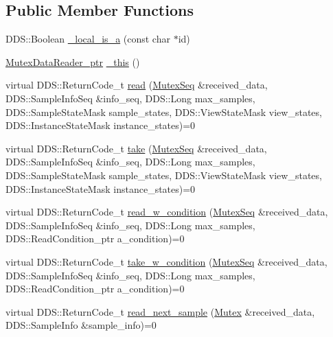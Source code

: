 \subsection*{Public Member Functions}
\begin{DoxyCompactItemize}
\item 
DDS::Boolean \hyperlink{classKnowledge_1_1MutexDataReader_aaada9486c9827e216a4c270e16dab516}{\_\-local\_\-is\_\-a} (const char $\ast$id)
\item 
\hyperlink{classKnowledge_1_1MutexDataReader}{MutexDataReader\_\-ptr} \hyperlink{classKnowledge_1_1MutexDataReader_a33f387fdc9f878e1ed448d63de1ec4c7}{\_\-this} ()
\item 
virtual DDS::ReturnCode\_\-t \hyperlink{classKnowledge_1_1MutexDataReader_af9d5bf62acb99639c541642065b8da93}{read} (\hyperlink{namespaceKnowledge_a3165529aa87299c6a92754fbd7eeeff4}{MutexSeq} \&received\_\-data, DDS::SampleInfoSeq \&info\_\-seq, DDS::Long max\_\-samples, DDS::SampleStateMask sample\_\-states, DDS::ViewStateMask view\_\-states, DDS::InstanceStateMask instance\_\-states)=0
\item 
virtual DDS::ReturnCode\_\-t \hyperlink{classKnowledge_1_1MutexDataReader_a9deff0455f4676c19067cde4b7962dd2}{take} (\hyperlink{namespaceKnowledge_a3165529aa87299c6a92754fbd7eeeff4}{MutexSeq} \&received\_\-data, DDS::SampleInfoSeq \&info\_\-seq, DDS::Long max\_\-samples, DDS::SampleStateMask sample\_\-states, DDS::ViewStateMask view\_\-states, DDS::InstanceStateMask instance\_\-states)=0
\item 
virtual DDS::ReturnCode\_\-t \hyperlink{classKnowledge_1_1MutexDataReader_a5f439299bf5fb0ee0472aaafb3753f72}{read\_\-w\_\-condition} (\hyperlink{namespaceKnowledge_a3165529aa87299c6a92754fbd7eeeff4}{MutexSeq} \&received\_\-data, DDS::SampleInfoSeq \&info\_\-seq, DDS::Long max\_\-samples, DDS::ReadCondition\_\-ptr a\_\-condition)=0
\item 
virtual DDS::ReturnCode\_\-t \hyperlink{classKnowledge_1_1MutexDataReader_a22ca79ab8a83d7506174b376addac467}{take\_\-w\_\-condition} (\hyperlink{namespaceKnowledge_a3165529aa87299c6a92754fbd7eeeff4}{MutexSeq} \&received\_\-data, DDS::SampleInfoSeq \&info\_\-seq, DDS::Long max\_\-samples, DDS::ReadCondition\_\-ptr a\_\-condition)=0
\item 
virtual DDS::ReturnCode\_\-t \hyperlink{classKnowledge_1_1MutexDataReader_ad5dc3a857e5cc711b00eb68004af84ac}{read\_\-next\_\-sample} (\hyperlink{structKnowledge_1_1Mutex}{Mutex} \&received\_\-data, DDS::SampleInfo \&sample\_\-info)=0
\item 

\end{DoxyCompactItemize}
